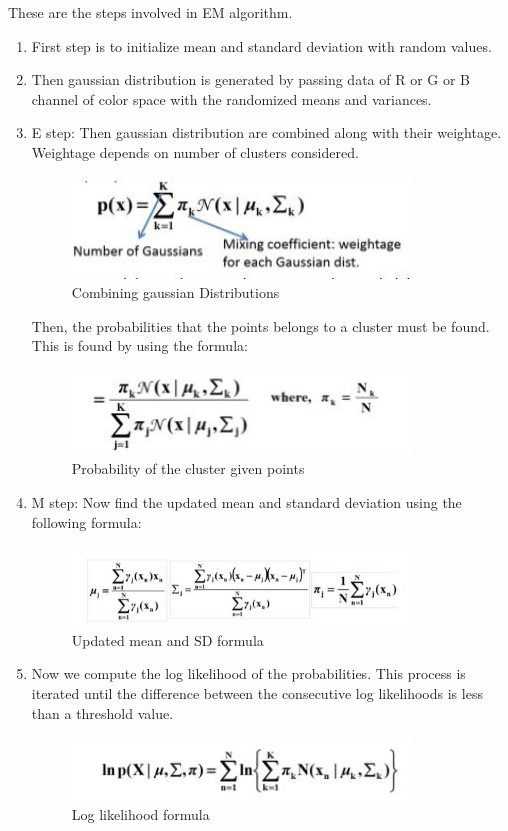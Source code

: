 \documentclass[12pt]{article}
\begin{document}
These are the steps involved in EM algorithm.
\begin{enumerate}
\item First step is to initialize mean and standard deviation with random values.
\item Then gaussian distribution is generated by passing data of R or G or B channel of color space with the  randomized means and variances. 
\item E step: Then gaussian distribution are combined along with their weightage. Weightage depends on number of clusters considered.
\begin{figure}[h]
    \centering
    \includegraphics[width=9cm]{Estep}
    \caption{Combining gaussian Distributions}
    \label{fig:Combining gaussian Distributions}
\end{figure}
Then, the probabilities that the points belongs to a cluster must be found. This is found by using the formula:
\begin{figure}[h]
    \centering
    \includegraphics[width=9cm]{Pcx}
    \caption{Probability of the cluster given points}
    \label{fig:Probability of the cluster given points}
\end{figure}
\item M step: Now find the updated mean and standard deviation using the following formula:
\begin{figure}[h]
    \centering
    \includegraphics[width=9cm]{msd}
    \caption{Updated mean and SD formula}
    \label{fig:Updated mean and SD formula}
\end{figure}

\item Now we compute the log likelihood of the probabilities. This process is iterated until the difference between the consecutive log likelihoods is less than a threshold value.
\newpage
\begin{figure}[h]
    \centering
    \includegraphics[width=9cm]{logl}
    \caption{Log likelihood formula}
    \label{fig:Log likelihood formula}
\end{figure}
\end{enumerate}
\end{document}

